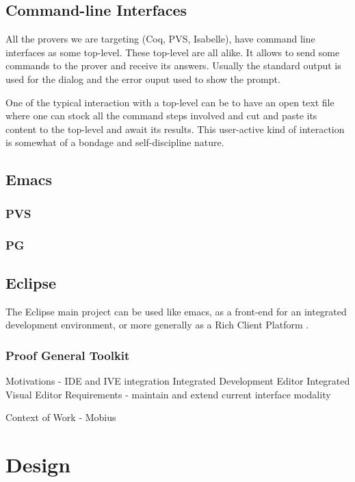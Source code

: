 \documentclass{entcs}
\begin{document}
\subsection{Command-line Interfaces}
All the provers we are targeting (Coq, PVS, Isabelle), have command line interfaces as 
some top-level. These top-level are all alike. It allows to send some commands
to the prover and receive its answers. Usually the standard output is
used for the dialog and the error ouput used to show the prompt.

One of the typical interaction with a top-level can be to have an open text file
where one can stock all the command steps involved and cut and paste its 
content to the top-level and await its results. This user-active kind of 
interaction is somewhat of a bondage and self-discipline nature.



\subsection{Emacs}
\subsubsection{PVS }
\subsubsection{PG}
\subsection{Eclipse}
The Eclipse main project can be used like emacs, as a front-end 
for an integrated development environment, or more generally as
a Rich Client Platform \cite{eclipse-rcp}. 
\subsubsection{Proof General Toolkit}

Motivations - IDE and IVE integration
Integrated Development Editor
Integrated Visual Editor
Requirements - maintain and extend current interface modality

Context of Work - Mobius

\section{Design}
\end{document}
